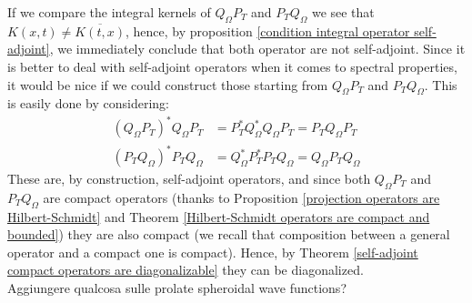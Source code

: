 \documentclass[corpo=11pt, stile=classica, tipotesi=custom,
greek, evenboxes, english]{toptesi}
\numberwithin{equation}{chapter}
\theoremstyle{remark}
\begin{document}
If we compare the integral kernels of $Q_{\Omega} P_T$ and $P_T Q_{\Omega}$ we see that $K(x,t) \neq \overline{K(t,x)}$, hence, by proposition \ref{condition integral operator self-adjoint}, we immediately conclude that both operator are not self-adjoint. {\color{red} Since it is better to deal with self-adjoint operators when it comes to spectral properties, it would be nice if we could construct those starting from $Q_{\Omega} P_T$ and $P_T Q_{\Omega}$.} This is easily done by considering:
\begin{align}
	(Q_{\Omega} P_T)^* Q_{\Omega} P_T &= P_T^* Q_{\Omega}^* Q_{\Omega} P_T= P_T Q_{\Omega} P_T\\
	(P_T Q_{\Omega})^* P_T Q_{\Omega} &= Q_{\Omega}^* P_T^* P_T Q_{\Omega} = Q_{\Omega} P_T Q_{\Omega}
\end{align} 
These are, by construction, self-adjoint operators, and since both $Q_{\Omega} P_T$ and $P_T Q_{\Omega}$ are compact operators (thanks to Proposition \ref{projection operators are Hilbert-Schmidt} and Theorem \ref{Hilbert-Schmidt operators are compact and bounded}) they are also compact (we recall that composition between a general operator and a compact one is compact). Hence, by Theorem \ref{self-adjoint compact operators are diagonalizable} they can be diagonalized.\\
{\color{red} Aggiungere qualcosa sulle prolate spheroidal wave functions?}
\end{document}
